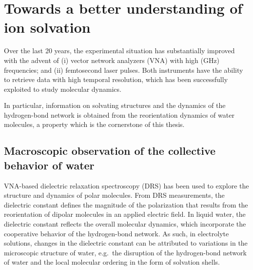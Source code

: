 \section{Towards a better understanding of ion solvation}

Over the last 20 years, the experimental situation has substantially improved with the advent of (i) vector network analyzers (VNA) with high (GHz) frequencies; and (ii) femtosecond laser pulses. Both instruments have the ability to retrieve data with high temporal resolution, which has been successfully exploited to study molecular dynamics.\!\cite{Woutersen1999,Buchner2004,Loparo2004,Eaves2005,Logsdon2005,Rezus2005,Fecko2005,Rezus2006,Buchner2008,Thogersen2008,Piatkowski2009,Prajapati2010,Timmer2010,Vyas2011,Rahman2012,Ensing2013,Ermilova2014,Ottosson2014c,Balos2015a,Baiz2015,Stevenson2015,Shattuck2016,Zhang2016,Balos2017a,Strudwick2018}




In particular, information on solvating structures and the dynamics of the hydrogen-bond network is obtained from the reorientation dynamics of water molecules,\!\cite{Buchner2004,Loparo2004,Rezus2005,Rezus2006,Buchner2008,Thogersen2008,Ensing2013,Ottosson2014c,Shattuck2016} a property which is the cornerstone of this thesis.




\subsection{Macroscopic observation of the collective behavior of water}



VNA-based dielectric relaxation spectroscopy (DRS) has been used to explore the structure and dynamics of polar molecules.\!\cite{Buchner2004,Logsdon2005,Buchner2008,Prajapati2010,Vyas2011,Rahman2012,Ensing2013,Ermilova2014,Ottosson2014c,Balos2015a,Balos2017a} From DRS measurements, the dielectric constant defines the magnitude of the polarization that results from the reorientation of dipolar molecules in an applied electric field. In liquid water, the dielectric constant reflects the overall molecular dynamics, which incorporate the cooperative behavior of the hydrogen-bond network. As such, in electrolyte solutions, changes in the dielectric constant can be attributed to variations in the microscopic structure of water, e.g.\ the disruption of the hydrogen-bond network of water and the local molecular ordering in the form of solvation shells.



